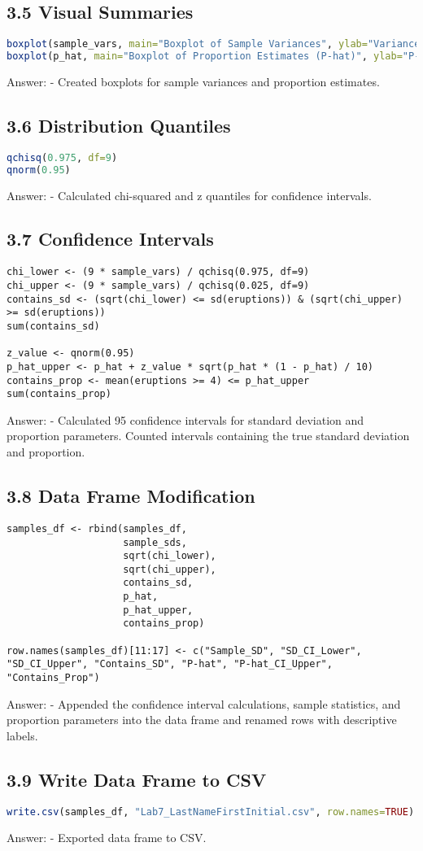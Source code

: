 \documentclass{article}
\begin{document}
\subsection*{3.5 Visual Summaries}
\begin{lstlisting}[language=R]
boxplot(sample_vars, main="Boxplot of Sample Variances", ylab="Variance")
boxplot(p_hat, main="Boxplot of Proportion Estimates (P-hat)", ylab="P-hat")
\end{lstlisting}
Answer:
- Created boxplots for sample variances and proportion estimates.

\subsection*{3.6 Distribution Quantiles}
\begin{lstlisting}[language=R]
qchisq(0.975, df=9)
qnorm(0.95)
\end{lstlisting}
Answer:
- Calculated chi-squared and z quantiles for confidence intervals.

\subsection*{3.7 Confidence Intervals}
\begin{lstlisting}
chi_lower <- (9 * sample_vars) / qchisq(0.975, df=9)
chi_upper <- (9 * sample_vars) / qchisq(0.025, df=9)
contains_sd <- (sqrt(chi_lower) <= sd(eruptions)) & (sqrt(chi_upper) >= sd(eruptions))
sum(contains_sd)

z_value <- qnorm(0.95)
p_hat_upper <- p_hat + z_value * sqrt(p_hat * (1 - p_hat) / 10)
contains_prop <- mean(eruptions >= 4) <= p_hat_upper
sum(contains_prop)
\end{lstlisting}
Answer:
- Calculated 95 confidence intervals for standard deviation and proportion parameters. Counted intervals containing the true standard deviation and proportion.

\subsection*{3.8 Data Frame Modification}
\begin{lstlisting}
samples_df <- rbind(samples_df,
                    sample_sds,
                    sqrt(chi_lower),
                    sqrt(chi_upper),
                    contains_sd,
                    p_hat,
                    p_hat_upper,
                    contains_prop)

row.names(samples_df)[11:17] <- c("Sample_SD", "SD_CI_Lower", "SD_CI_Upper", "Contains_SD", "P-hat", "P-hat_CI_Upper", "Contains_Prop")
\end{lstlisting}
Answer:
- Appended the confidence interval calculations, sample statistics, and proportion parameters into the data frame and renamed rows with descriptive labels.

\subsection*{3.9 Write Data Frame to CSV}
\begin{lstlisting}[language=R]
write.csv(samples_df, "Lab7_LastNameFirstInitial.csv", row.names=TRUE)
\end{lstlisting}
Answer:
- Exported data frame to CSV.
\end{document}
